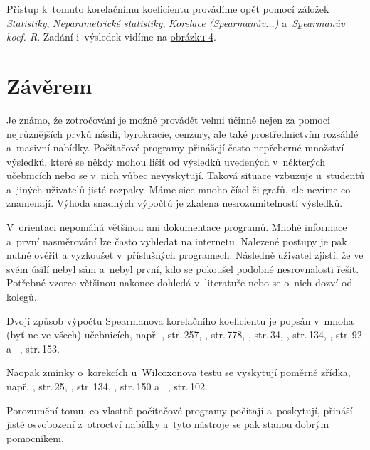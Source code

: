 Přístup k~tomuto korelačnímu koeficientu provádíme opět pomocí záložek
{\it Statistiky}, {\it Neparametrické statistiky}, {\it Korelace (Spearmanův...)} a~{\it S\b{p}earmanův koef. R}. Zadání i~výsledek vidíme na \hyperref[obrazek4]{obrázku 4}.


\newpage
\section*{Závěrem}

Je známo, že zotročování je možné provádět velmi účinně nejen za pomoci nejrůznějších prvků násilí, byrokracie, cenzury, 
ale také prostřednictvím rozsáhlé a~masivní nabídky.
Počítačové programy přinášejí často nepřeberné množství výsledků, které se někdy mohou lišit od výsledků uvedených v~některých
učebnicích nebo se v~nich vůbec nevyskytují.
Taková situace vzbuzuje u~studentů a~jiných uživatelů jisté rozpaky. Máme sice mnoho čísel či grafů, ale nevíme co znamenají. Výhoda snadných výpočtů je zkalena nesrozumitelností výsledků.

V~orientaci nepomáhá většinou ani dokumentace programů. Mnohé informace a~první nasměrování lze často vyhledat na internetu. Nalezené postupy je pak nutné 
ověřit a vyzkoušet v~příslušných programech. Následně uživatel zjistí, že ve svém úsilí nebyl sám a~nebyl první, kdo se
pokoušel podobné nesrovnalosti řešit. Potřebné vzorce většinou nakonec dohledá v~literatuře nebo se o~nich dozví od kolegů. 

Dvojí způsob výpočtu Spearmanova korelačního koeficientu je
popsán v~mnoha (byť ne ve všech) učebnicích, např. 
\cite{3}, str.\,257, 
\cite{4}, str.\,778, 
\cite{5}, str.\,34, 
\cite{7}, str.\,134, 
\cite{10}, str.\,92 a~%
\cite{11}, str.\,153.

Naopak zmínky o~korekcích u~Wilcoxonova testu se vyskytují poměrně zřídka, např. 
\cite{5}, str.\,25, 
\cite{7}, str.\,134, 
\cite{10}, str.\,150 a~%
\cite{11}, str.\,102.

Porozumění tomu, co vlastně počítačové programy počítají a~poskytují, přináší jisté osvobození z~otroctví nabídky a~tyto
nástroje se pak stanou dobrým pomocníkem.


